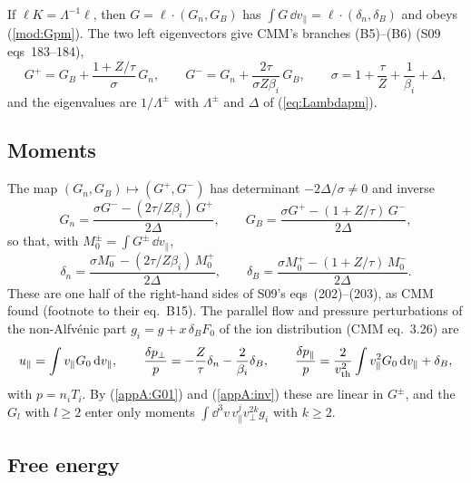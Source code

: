 If $\ell K=\Lambda^{-1}\ell$, then $G=\ell\cdot(G_n,G_B)$ has $\int G\,\dd v_\parallel=\ell\cdot(\delta_n,\delta_B)$ and obeys (\ref{mod:Gpm}). The two left eigenvectors give CMM's branches (B5)--(B6) (S09 eqs~183--184),
\begin{equation*}
  G^+=G_B+\frac{1+Z/\tau}{\sigma}\,G_n,\qquad
  G^-=G_n+\frac{2\tau}{\sigma Z\beta_i}\,G_B,\qquad
  \sigma=1+\frac{\tau}{Z}+\frac{1}{\beta_i}+\Delta,
\end{equation*}
and the eigenvalues are $1/\Lambda^\pm$ with $\Lambda^\pm$ and $\Delta$ of (\ref{eq:Lambdapm}).

\subsection{Moments}\label{appA:moments}

The map $(G_n,G_B)\mapsto(G^+,G^-)$ has determinant $-2\Delta/\sigma\ne0$ and inverse
\begin{equation}\label{appA:inv}
  G_n=\frac{\sigma G^--(2\tau/Z\beta_i)\,G^+}{2\Delta},\qquad
  G_B=\frac{\sigma G^+-(1+Z/\tau)\,G^-}{2\Delta},
\end{equation}
so that, with $M_0^\pm=\int G^\pm\,\dd v_\parallel$,
\begin{equation}\label{appA:dndB}
  \delta_n=\frac{\sigma M_0^--(2\tau/Z\beta_i)\,M_0^+}{2\Delta},\qquad
  \delta_B=\frac{\sigma M_0^+-(1+Z/\tau)\,M_0^-}{2\Delta}.
\end{equation}
These are one half of the right-hand sides of S09's eqs~(202)--(203), as CMM found (footnote to their eq.~B15). The parallel flow and pressure perturbations of the non-Alfv\'enic part $g_i=g+x\,\delta_BF_0$ of the ion distribution (CMM eq.~3.26) are
\begin{equation*}
  u_\parallel=\int v_\parallel G_0\,\mathrm{d} v_\parallel,\qquad
  \frac{\delta p_\perp}{p}=-\frac{Z}{\tau}\delta_n-\frac{2}{\beta_i}\delta_B,\qquad
  \frac{\delta p_\parallel}{p}=\frac{2}{v_{\mathrm{th}}^2}\int v_\parallel^2G_0\,\mathrm{d} v_\parallel+\delta_B,
\end{equation*}
with $p=n_iT_i$. By (\ref{appA:G01}) and (\ref{appA:inv}) these are linear in $G^\pm$, and the $G_l$ with $l\ge2$ enter only moments $\int\dd^3v\,v_\parallel^jv_\perp^{2k}g_i$ with $k\ge2$.

\subsection{Free energy}\label{appA:energy}

